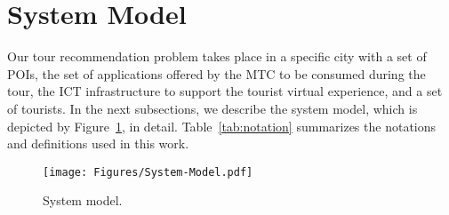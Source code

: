 \section{System Model}\label{sec:system-model}

Our tour recommendation problem takes place in a specific city with a set of POIs, the set of applications offered by the MTC to be consumed during the tour, the ICT infrastructure to support the tourist virtual experience, and a set of tourists. In the next subsections, we describe the system model{, which is depicted by Figure~\ref{fig:System-Model},} in detail. Table~\ref{tab:notation} summarizes the notations and definitions used in this work.

\begin{figure}[t]
    \centering
    \texttt{[image: Figures/System-Model.pdf]}
    \caption{{System model.}}
    \label{fig:System-Model}
\end{figure}


